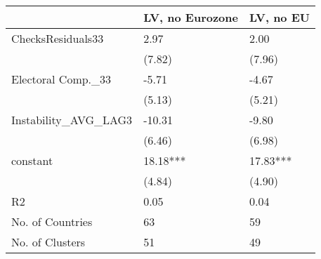 \begin{tabular}{lll}
  \hline
 & LV, no Eurozone & LV, no EU \\ 
  \hline
ChecksResiduals33 & 2.97 & 2.00 \\ 
   & (7.82) & (7.96) \\ 
  Electoral Comp.\_33 & -5.71 & -4.67 \\ 
   & (5.13) & (5.21) \\ 
  Instability\_AVG\_LAG3 & -10.31 & -9.80 \\ 
   & (6.46) & (6.98) \\ 
  constant & 18.18*** & 17.83*** \\ 
   & (4.84) & (4.90) \\ 
  R2 & 0.05 & 0.04 \\ 
  No. of Countries & 63 & 59 \\ 
  No. of Clusters & 51 & 49 \\ 
   \hline
\end{tabular}
